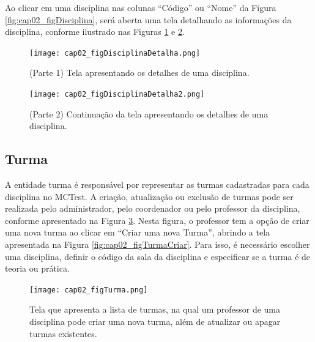 Ao clicar em uma disciplina nas colunas ``Código'' ou ``Nome'' da Figura \ref{fig:cap02_figDisciplina}, será aberta uma tela detalhando as informações da disciplina, conforme ilustrado nas Figuras \ref{fig:cap02_figDisciplinaDetalha} e \ref{fig:cap02_figDisciplinaDetalha2}.

\begin{figure}[!ht]
  \centering
  \texttt{[image: cap02\_figDisciplinaDetalha.png]}
  \caption{(Parte 1) Tela apresentando os detalhes de uma disciplina.}
  \label{fig:cap02_figDisciplinaDetalha}
\end{figure}

\begin{figure}[!ht]
  \centering
  \texttt{[image: cap02\_figDisciplinaDetalha2.png]}
  \caption{(Parte 2) Continuação da tela apresentando os detalhes de uma disciplina.}
  \label{fig:cap02_figDisciplinaDetalha2}
\end{figure}











\subsection{Turma}\label{sec:turma}

A entidade turma é responsável por representar as turmas cadastradas para cada disciplina no MCTest. A criação, atualização ou exclusão de turmas pode ser realizada pelo administrador, pelo coordenador ou pelo professor da disciplina, conforme apresentado na Figura \ref{fig:cap02_figTurma}. Nesta figura, o professor tem a opção de criar uma nova turma ao clicar em ``Criar uma nova Turma'', abrindo a tela apresentada na Figura \ref{fig:cap02_figTurmaCriar}. Para isso, é necessário escolher uma disciplina, definir o código da sala da disciplina e especificar se a turma é de teoria ou prática.

\begin{figure}[!ht]
  \centering
  \texttt{[image: cap02\_figTurma.png]}
  \caption{Tela que apresenta a lista de turmas, na qual um professor de uma disciplina pode criar uma nova turma, além de atualizar ou apagar turmas existentes.}
  \label{fig:cap02_figTurma}
\end{figure}



